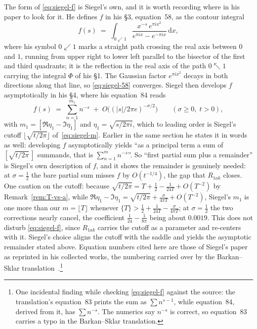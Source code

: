 \documentclass[11pt]{article}
\theoremstyle{definition}
\begin{document}
The form of \eqref{eq:siegel-f} is Siegel's own, and it is worth recording where
in his paper to look for it. He defines $f$ in his \S3, equation~58, as the
contour integral
\begin{equation}\label{eq:siegel-58}
f(s)
\;=\;
\int_{0\swarrow 1}
\frac{x^{-s}\,e^{\pi i x^{2}}}{e^{\pi i x}-e^{-\pi i x}}\,\mathrm{d}x ,
\end{equation}
where his symbol $0\swarrow 1$ marks a straight path crossing the real axis
between $0$ and $1$, running from upper right to lower left parallel to the
bisector of the first and third quadrants; it is the reflection in the real axis
of the path $0\nwarrow 1$ carrying the integral $\Phi$ of his \S1. The Gaussian
factor $e^{\pi i x^{2}}$ decays in both directions along that line, so
\eqref{eq:siegel-58} converges. Siegel then develops $f$ asymptotically in his \S4,
where his equation~84 reads
\begin{equation}\label{eq:siegel-84}
f(s)
\;=\;
\sum_{n=1}^{m_{1}} n^{-s}
\;+\;
O\!\bigl((\lvert s\rvert/2\pi e)^{-\sigma/2}\bigr)
\qquad (\sigma\ge 0,\; t>0),
\end{equation}
with $m_{1}=[\Re\eta_{1}-\Im\eta_{1}]$ and $\eta_{1}=\sqrt{s/2\pi i}$, which to
leading order is Siegel's cutoff $\lfloor\sqrt{t/2\pi}\rfloor$
of~\eqref{eq:siegel-m}. Earlier in the same section he states it in words as
well: developing $f$ asymptotically yields ``as a principal term a sum of
$[\sqrt{t/2\pi}\,]$ summands, that is $\sum_{n=1}^{m}n^{-s}$''. So ``first
partial sum plus a remainder'' is Siegel's own description of $f$, and it
shows the remainder is genuinely needed: at $\sigma=\tfrac12$ the bare
partial sum misses $f$ by $O(t^{-1/4})$, the gap that $R_{1ak}$ closes.
One caution on the cutoff: because
$\sqrt{t/2\pi}=T+\tfrac12-\tfrac1{24T}+O(T^{-2})$ by
Remark~\ref{rem:T-vs-a}, while
$\Re\eta_{1}-\Im\eta_{1}=\sqrt{t/2\pi}+\tfrac{\sigma}{4\pi T}+O(T^{-2})$,
Siegel's $m_{1}$ is one more than our $m=\lfloor T\rfloor$ whenever
$\{T\}>\tfrac12+\tfrac1{24T}-\tfrac{\sigma}{4\pi T}$; at $\sigma=\tfrac12$
the two corrections nearly cancel, the coefficient
$\tfrac1{24}-\tfrac1{8\pi}$ being about $0.0019$. This does not disturb
\eqref{eq:siegel-f}, since $R_{1ak}$ carries the cutoff as a parameter and
re-centers with it. Siegel's choice aligns the cutoff with the saddle and
yields the asymptotic remainder stated above. Equation numbers cited here are
those of Siegel's paper as reprinted
in his collected works, the numbering carried over by the Barkan--Sklar
translation~\cite{BarkanSklar2018}.\footnote{One incidental finding while
checking \eqref{eq:siegel-f} against the source: the translation's
equation~83 prints the sum as $\sum n^{s-1}$, while equation~84, derived from
it, has $\sum n^{-s}$. The numerics say $n^{-s}$ is correct, so equation~83
carries a typo in the Barkan--Sklar translation.}
\end{document}
